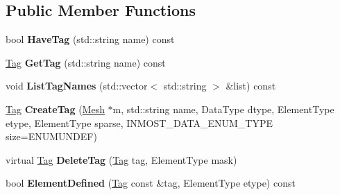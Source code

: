 \subsection*{Public Member Functions}
\begin{DoxyCompactItemize}
\item 
\hypertarget{classINMOST_1_1TagManager_a61d1c149756989d61868d41e374d7c76}{bool {\bfseries Have\-Tag} (std\-::string name) const }\label{classINMOST_1_1TagManager_a61d1c149756989d61868d41e374d7c76}

\item 
\hypertarget{classINMOST_1_1TagManager_aeadbec8cfb140793eb5a594649ba0247}{\hyperlink{classINMOST_1_1Tag}{Tag} {\bfseries Get\-Tag} (std\-::string name) const }\label{classINMOST_1_1TagManager_aeadbec8cfb140793eb5a594649ba0247}

\item 
\hypertarget{classINMOST_1_1TagManager_a5bb782655ad079208d1b2b6e614d0499}{void {\bfseries List\-Tag\-Names} (std\-::vector$<$ std\-::string $>$ \&list) const }\label{classINMOST_1_1TagManager_a5bb782655ad079208d1b2b6e614d0499}

\item 
\hypertarget{classINMOST_1_1TagManager_ac85b7509d389191f59772bf5defc931b}{\hyperlink{classINMOST_1_1Tag}{Tag} {\bfseries Create\-Tag} (\hyperlink{classINMOST_1_1Mesh}{Mesh} $\ast$m, std\-::string name, Data\-Type dtype, Element\-Type etype, Element\-Type sparse, I\-N\-M\-O\-S\-T\-\_\-\-D\-A\-T\-A\-\_\-\-E\-N\-U\-M\-\_\-\-T\-Y\-P\-E size=E\-N\-U\-M\-U\-N\-D\-E\-F)}\label{classINMOST_1_1TagManager_ac85b7509d389191f59772bf5defc931b}

\item 
\hypertarget{classINMOST_1_1TagManager_aff704532d5a261a3e6572c84f54d14c8}{virtual \hyperlink{classINMOST_1_1Tag}{Tag} {\bfseries Delete\-Tag} (\hyperlink{classINMOST_1_1Tag}{Tag} tag, Element\-Type mask)}\label{classINMOST_1_1TagManager_aff704532d5a261a3e6572c84f54d14c8}

\item 
\hypertarget{classINMOST_1_1TagManager_a320c0dbd9ead879cc09e3c497b95b954}{bool {\bfseries Element\-Defined} (\hyperlink{classINMOST_1_1Tag}{Tag} const \&tag, Element\-Type etype) const }\label{classINMOST_1_1TagManager_a320c0dbd9ead879cc09e3c497b95b954}

\end{DoxyCompactItemize}
